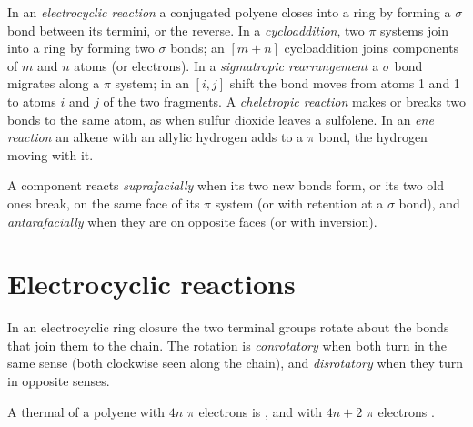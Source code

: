 \begin{definition}\label{def:b3:pericyclic:families}
In an \emph{electrocyclic reaction} a conjugated
polyene closes into a ring by forming a $\sigma$ bond between its termini, or the
reverse. In a \emph{cycloaddition}, two $\pi$ systems join
into a ring by forming two $\sigma$ bonds; an $[m + n]$ cycloaddition joins components
of $m$ and $n$ atoms (or electrons). In a \emph{sigmatropic
rearrangement} a $\sigma$ bond migrates along a $\pi$
system; in an $[i, j]$ shift the bond moves from atoms 1 and 1 to atoms $i$ and $j$
of the two fragments. A \emph{cheletropic reaction} makes or breaks two bonds to the same atom, as when sulfur dioxide
leaves a sulfolene. In an \emph{ene reaction} an alkene
with an allylic hydrogen adds to a $\pi$ bond, the hydrogen moving with it.
\end{definition}

\begin{definition}\label{def:b3:pericyclic:faciality}
A component reacts \emph{suprafacially} when its two new
bonds form, or its two old ones break, on the same face of its $\pi$ system (or with
retention at a $\sigma$ bond), and \emph{antarafacially} when they
are on opposite faces (or with inversion).
\end{definition}

\section{Electrocyclic reactions}

\begin{definition}\label{def:b3:pericyclic:rotation-modes}
In an electrocyclic ring closure the two terminal groups rotate about the bonds
that join them to the chain. The rotation is \emph{conrotatory}
when both turn in the same sense (both clockwise seen along the chain), and
\emph{disrotatory} when they turn in opposite senses.
\end{definition}

\begin{theorem}\label{thm:b3:pericyclic:electrocyclic}
A thermal  of a polyene with $4n$ $\pi$ electrons is
, and with $4n + 2$ $\pi$ electrons .
\end{theorem}

